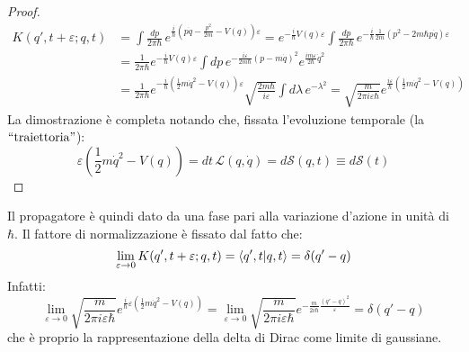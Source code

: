 \begin{proof}
	\begin{equation*}
		\begin{split}
			K(q',t+\varepsilon ; q,t)
			&= \int \frac{dp}{2\pi\hbar}\, e^{\frac{i}{\hbar} ( p\dot{q} - \frac{p^2}{2m} - V(q) ) \varepsilon} = e^{- \frac{i}{\hbar} V(q) \varepsilon} \int \frac{dp}{2\pi\hbar}\, e^{- \frac{i}{\hbar} \frac{1}{2m} (p^2 - 2m\hbar p\dot{q}) \varepsilon} \\
			&= \frac{1}{2\pi\hbar} e^{-\frac{i}{\hbar} V(q) \varepsilon} \int dp\, e^{-\frac{i \varepsilon}{2m\hbar} (p - m\dot{q})^2} e^{\frac{i m \varepsilon}{2\hbar} \dot{q}^2} \\
			&= \frac{1}{2\pi\hbar} e^{-\frac{i}{\hbar} (\frac{1}{2}m \dot{q}^2 - V(q)) \varepsilon} \sqrt{\frac{2m\hbar}{i\varepsilon}} \int d\lambda\, e^{-\lambda^2} = \sqrt{\frac{m}{2\pi i \varepsilon \hbar}} e^{\frac{i\varepsilon}{\hbar} (\frac{1}{2} m \dot{q}^2 - V(q))}
		\end{split}
	\end{equation*}
	La dimostrazione è completa notando che, fissata l'evoluzione temporale (la $ ``\text{traiettoria}" $):
	\begin{equation*}
		\varepsilon \left( \frac{1}{2} m \dot{q}^2 - V(q) \right) = dt\,\mathscr{L}(q,\dot{q}) = d\mathcal{S}(q,t) \equiv d\mathcal{S}(t)
	\end{equation*}
\end{proof}

Il propagatore è quindi dato da una fase pari alla variazione d'azione in unità di $ \hbar $. Il fattore di normalizzazione è fissato dal fatto che:
\begin{equation}
	\lim_{\varepsilon \rightarrow 0} K(q',t+\varepsilon ; q,t) = \braket{q',t | q,t} = \delta(q' - q)
	\label{eq:4.17}
\end{equation}
Infatti:
\begin{equation*}
	\lim_{\varepsilon \rightarrow 0} \sqrt{\frac{m}{2\pi i \varepsilon \hbar}} e^{\frac{i}{\hbar} \varepsilon ( \frac{1}{2} m \dot{q}^2 - V(q))} = \lim_{\varepsilon \rightarrow 0} \sqrt{\frac{m}{2\pi i \varepsilon \hbar}} e^{-\frac{m}{2i\hbar} \frac{(q' - q)^2}{\varepsilon}} = \delta(q' - q)
\end{equation*}
che è proprio la rappresentazione della delta di Dirac come limite di gaussiane.










